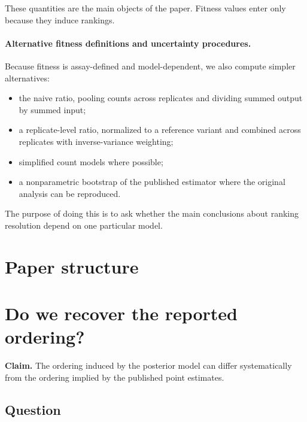 \documentclass[11pt]{article}
\begin{document}
These quantities are the main objects of the paper. Fitness values enter only because they induce rankings.

\paragraph{Alternative fitness definitions and uncertainty procedures.}
Because fitness is assay-defined and model-dependent, we also compute simpler alternatives:
\begin{itemize}
  \item the naive ratio, pooling counts across replicates and dividing summed output by summed input;
  \item a replicate-level ratio, normalized to a reference variant and combined across replicates with inverse-variance weighting;
  \item simplified count models where possible;
  \item a nonparametric bootstrap of the published estimator where the original analysis can be reproduced.
\end{itemize}

The purpose of doing this is to ask whether the main conclusions about ranking resolution depend on one particular model.

\section*{\Large{Paper structure}}


\setcounter{section}{0}
\section{Do we recover the reported ordering?}

\begin{callout}
\textbf{Claim.}
The ordering induced by the posterior model can differ systematically from the ordering implied by the published point estimates.
\end{callout}

\subsection*{Question}
\end{document}
